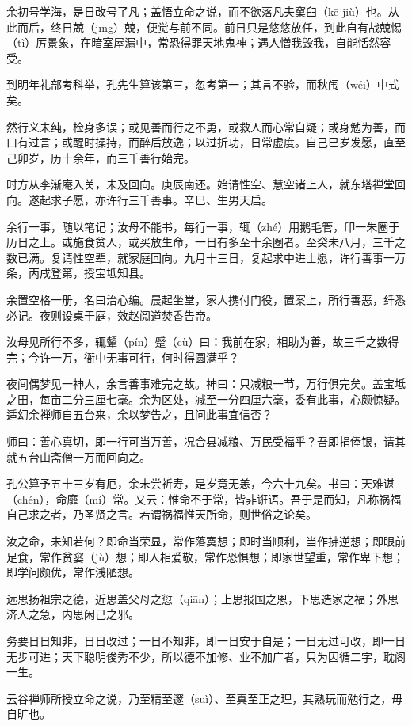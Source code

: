\documentclass[12pt,UTF8]{ctexbook}
\begin{document}
余初号学海，是日改号了凡；盖悟立命之说，而不欲落凡夫窠臼（kē jiù）也。从此而后，终日兢（jīng）兢，便觉与前不同。前日只是悠悠放任，到此自有战兢惕（tì）厉景象，在暗室屋漏中，常恐得罪天地鬼神；遇人憎我毁我，自能恬然容受。

到明年礼部考科举，孔先生算该第三，忽考第一；其言不验，而秋闱（wéi）中式矣。

然行义未纯，检身多误；或见善而行之不勇，或救人而心常自疑；或身勉为善，而口有过言；或醒时操持，而醉后放逸；以过折功，日常虚度。自己巳岁发愿，直至己卯岁，历十余年，而三千善行始完。

时方从李渐庵入关，未及回向。庚辰南还。始请性空、慧空诸上人，就东塔禅堂回向。遂起求子愿，亦许行三千善事。辛巳、生男天启。

余行一事，随以笔记；汝母不能书，每行一事，辄（zhé）用鹅毛管，印一朱圈于历日之上。或施食贫人，或买放生命，一日有多至十余圈者。至癸未八月，三千之数已满。复请性空辈，就家庭回向。九月十三日，复起求中进士愿，许行善事一万条，丙戌登第，授宝坻知县。

余置空格一册，名曰治心编。晨起坐堂，家人携付门役，置案上，所行善恶，纤悉必记。夜则设桌于庭，效赵阅道焚香告帝。

汝母见所行不多，辄颦（pín）蹙（cù）曰：我前在家，相助为善，故三千之数得完；今许一万，衙中无事可行，何时得圆满乎？

夜间偶梦见一神人，余言善事难完之故。神曰：只减粮一节，万行俱完矣。盖宝坻之田，每亩二分三厘七毫。余为区处，减至一分四厘六毫，委有此事，心颇惊疑。适幻余禅师自五台来，余以梦告之，且问此事宜信否？

师曰：善心真切，即一行可当万善，况合县减粮、万民受福乎？吾即捐俸银，请其就五台山斋僧一万而回向之。

孔公算予五十三岁有厄，余未尝祈寿，是岁竟无恙，今六十九矣。书曰：天难谌（chén），命靡（mí）常。又云：惟命不于常，皆非诳语。吾于是而知，凡称祸福自己求之者，乃圣贤之言。若谓祸福惟天所命，则世俗之论矣。

汝之命，未知若何？即命当荣显，常作落寞想；即时当顺利，当作拂逆想；即眼前足食，常作贫窭（jù）想；即人相爱敬，常作恐惧想；即家世望重，常作卑下想；即学问颇优，常作浅陋想。

远思扬祖宗之德，近思盖父母之愆（qiān）；上思报国之恩，下思造家之福；外思济人之急，内思闲己之邪。

务要日日知非，日日改过；一日不知非，即一日安于自是；一日无过可改，即一日无步可进；天下聪明俊秀不少，所以德不加修、业不加广者，只为因循二字，耽阁一生。

云谷禅师所授立命之说，乃至精至邃（suì）、至真至正之理，其熟玩而勉行之，毋自旷也。
\end{document}
